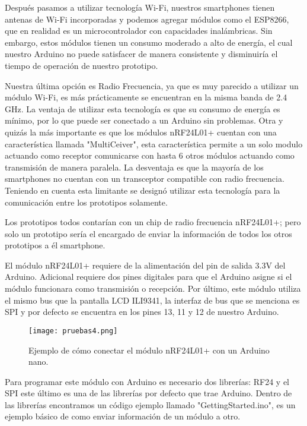\par \noindent
Después pasamos a utilizar tecnología Wi-Fi, nuestros smartphones tienen antenas de Wi-Fi incorporadas y podemos agregar módulos como el ESP8266, que en realidad es un microcontrolador con capacidades inalámbricas. Sin embargo, estos módulos tienen un consumo moderado a alto de energía, el cual nuestro Arduino no puede satisfacer de manera consistente y disminuiría el tiempo de operación de nuestro prototipo.

\par \noindent
Nuestra última opción es Radio Frecuencia, ya que es muy parecido a utilizar un módulo Wi-Fi, es más prácticamente se encuentran en la misma banda de 2.4 GHz. La ventaja de utilizar esta tecnología es que su consumo de energía es mínimo, por lo que puede ser conectado a un Arduino sin problemas. Otra y quizás la más importante es que los módulos nRF24L01+ cuentan con una característica llamada "MultiCeiver", esta característica permite a un solo modulo actuando como receptor comunicarse con hasta 6 otros módulos actuando como transmisión de manera paralela.  La desventaja es que la mayoría de los smartphones no cuentan con un transceptor compatible con radio frecuencia. Teniendo en cuenta esta limitante se designó utilizar esta tecnología para la comunicación entre los prototipos solamente. 

\par \noindent
Los prototipos todos contarían con un chip de radio frecuencia nRF24L01+; pero solo un prototipo sería el encargado de enviar la información de todos los otros prototipos a él smartphone. 

\par \noindent
El módulo nRF24L01+ requiere de la alimentación del pin de salida 3.3V del Arduino. Adicional requiere dos pines digitales para que el Arduino asigne si el módulo funcionara como transmisión o recepción. Por último, este módulo utiliza el mismo bus que la pantalla LCD ILI9341, la interfaz de bus que se menciona es SPI y por defecto se encuentra en los pines 13, 11 y 12 de nuestro Arduino. 

\begin{figure}[H]
	\centering
	\texttt{[image: pruebas4.png]}
	\caption{Ejemplo de cómo conectar el módulo nRF24L01+ con un Arduino nano.}
\end{figure}

\par \noindent
Para programar este módulo con Arduino es necesario dos librerías: RF24\cite{rf24} y el SPI este último es una de las librerías por defecto que trae Arduino. Dentro de las librerías encontramos un código ejemplo llamado "GettingStarted.ino", es un ejemplo básico de como enviar información de un módulo a otro.

